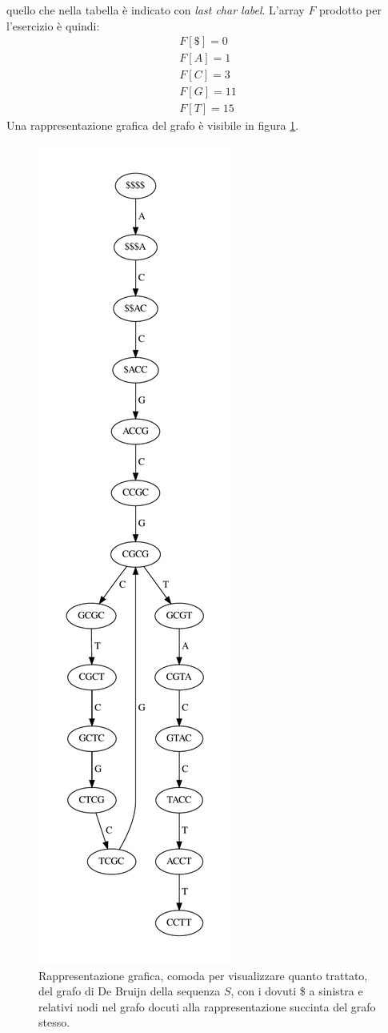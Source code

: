 \documentclass[a4paper,12pt, oneside]{book}
\begin{document}
quello che nella tabella è indicato con \textit{last char label}. L'array $F$
prodotto per l'esercizio è quindi:
\begin{gather*}
  F[\$] = 0\\
  F[A] = 1\\
  F[C] = 3\\
  F[G] = 11\\
  F[T] = 15
\end{gather*}
Una rappresentazione grafica del grafo è visibile in figura \ref{fig:dbg}.
\begin{figure}
  \centering
  \includegraphics[scale = 0.47]{img/assign3v.pdf}
  \caption{Rappresentazione grafica, comoda per visualizzare quanto trattato,
    del grafo di De Bruijn della 
    sequenza $S$, con i dovuti \$ a sinistra e relativi nodi nel grafo docuti
    alla rappresentazione succinta del grafo stesso.}
  \label{fig:dbg}
\end{figure}
\end{document}
